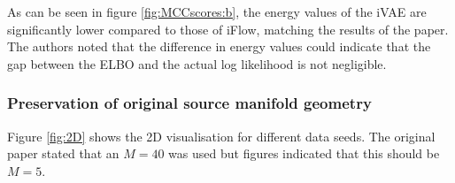 
As can be seen in figure \ref{fig:MCCscores:b}, the energy values of the iVAE are significantly lower compared to those of iFlow, matching the results of the paper. The authors noted that the difference in energy values could indicate that the gap between the ELBO and the actual log likelihood is not negligible.


\subsubsection{Preservation of original source manifold geometry}
\label{sec:geometry}
Figure \ref{fig:2D} shows the 2D visualisation for different data seeds. The original paper stated that an $M = 40$ was used but figures indicated that this should be $M = 5$. 


